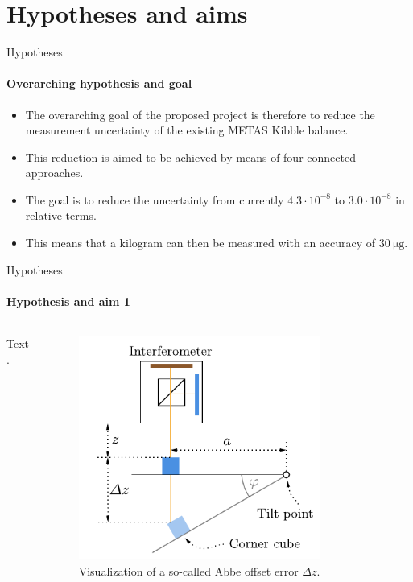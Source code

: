 \documentclass{beamer}
\begin{document}
\section{Hypotheses and aims}
\begin{frame}[allowframebreaks]{Hypotheses}
  \framesubtitle{Overarching hypothesis and goal}
    \begin{itemize}
        \item The overarching goal of the proposed project is therefore to reduce the measurement uncertainty of the existing METAS Kibble balance.
        \item This reduction is aimed to be achieved by means of four connected approaches.
        \item The goal is to reduce the uncertainty from currently $4.3\cdot 10^{-8}$ to $3.0\cdot 10^{-8}$ in relative terms.
        \item This means that a kilogram can then be measured with an accuracy of $\SI{30}{\micro\gram}$.
    \end{itemize}
\end{frame}

\begin{frame}[allowframebreaks]{Hypotheses}
  \framesubtitle{Hypothesis and aim 1}

  \begin{columns}
    \begin{column}{0.49\textwidth}
    Text.
    \end{column}
    
    \begin{column}{0.5\textwidth}
      \begin{figure}[h!] 
	\centering
	\includegraphics[width=0.8\textwidth]{figures/abbeerror.pdf}
	\caption{Visualization of a so-called Abbe offset error $\Delta z$.}
	\label{fig:abbeerror}
      \end{figure}
    \end{column}
  \end{columns}
\end{frame}
\end{document}
